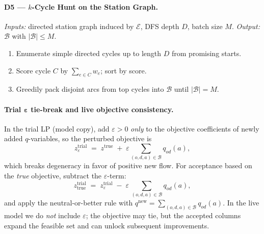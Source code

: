 \documentclass[11pt,a4paper]{article}
\begin{document}
\paragraph{D5 — $k$-Cycle Hunt on the Station Graph.}
\emph{Inputs:} directed station graph induced by $\mathcal{E}$, DFS depth $D$, batch size $M$.
\emph{Output:} $\mathcal{B}$ with $|\mathcal{B}|\le M$.
\begin{enumerate}
\item Enumerate simple directed cycles up to length $D$ from promising starts.
\item Score cycle $C$ by $\sum_{e\in C} w_e$; sort by score.
\item Greedily pack disjoint arcs from top cycles into $\mathcal{B}$ until $|\mathcal{B}|=M$.
\end{enumerate}

\paragraph{Trial $\boldsymbol{\varepsilon}$ tie-break and live objective consistency.}
In the trial LP (model copy), add $\varepsilon>0$ \emph{only} to the objective coefficients of newly added $q$-variables,
so the perturbed objective is
\[
z^{\mathrm{trial}}_{\varepsilon}
\;=\;
z^{\mathrm{true}} \;+\; \varepsilon\sum_{(o,d,a)\in\mathcal{B}} q_{od}(a),
\]
which breaks degeneracy in favor of positive new flow.
For acceptance based on the \emph{true} objective, subtract the $\varepsilon$-term:
\[
z^{\mathrm{trial}}_{\mathrm{true}}
\;=\;
z^{\mathrm{trial}}_{\varepsilon}
\;-\;
\varepsilon\,\sum_{(o,d,a)\in\mathcal{B}} q_{od}(a),
\]
and apply the neutral-or-better rule with $q^{\mathrm{new}}=\sum_{(o,d,a)\in\mathcal{B}} q_{od}(a)$.
In the live model we do \emph{not} include $\varepsilon$; the objective may tie, but the accepted columns
expand the feasible set and can unlock subsequent improvements.
\end{document}
